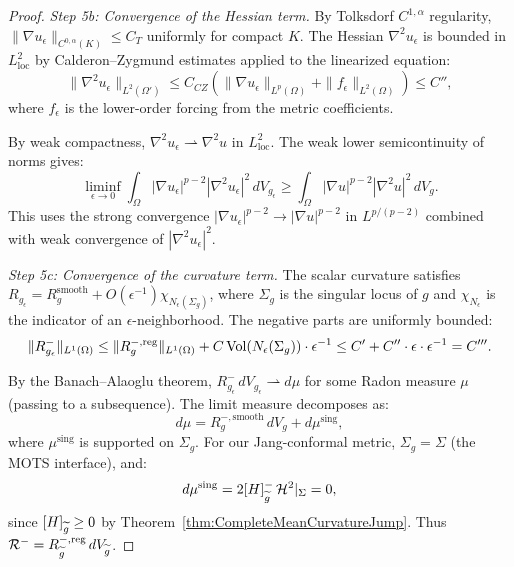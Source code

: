 \begin{proof}
\textit{Step 5b: Convergence of the Hessian term.} 
By Tolksdorf $C^{1,\alpha}$ regularity, $\|\nabla u_\epsilon\|_{C^{0,\alpha}(K)} \le C_T$ uniformly for compact $K$. The Hessian $\nabla^2 u_\epsilon$ is bounded in $L^2_{\mathrm{loc}}$ by Calderon--Zygmund estimates applied to the linearized equation:
\begin{equation}\label{eq:HessianL2Bound}
    \|\nabla^2 u_\epsilon\|_{L^2(\Omega')} \le C_{CZ} \left( \|\nabla u_\epsilon\|_{L^p(\Omega)} + \|f_\epsilon\|_{L^2(\Omega)} \right) \le C'',
\end{equation}
where $f_\epsilon$ is the lower-order forcing from the metric coefficients.

By weak compactness, $\nabla^2 u_\epsilon \rightharpoonup \nabla^2 u$ in $L^2_{\mathrm{loc}}$. The weak lower semicontinuity of norms gives:
\begin{equation}\label{eq:HessianLSC}
    \liminf_{\epsilon \to 0} \int_\Omega |\nabla u_\epsilon|^{p-2} |\nabla^2 u_\epsilon|^2 \, dV_{g_\epsilon} \ge \int_\Omega |\nabla u|^{p-2} |\nabla^2 u|^2 \, dV_g.
\end{equation}
This uses the strong convergence $|\nabla u_\epsilon|^{p-2} \to |\nabla u|^{p-2}$ in $L^{p/(p-2)}$ combined with weak convergence of $|\nabla^2 u_\epsilon|^2$.

\textit{Step 5c: Convergence of the curvature term.} 
The scalar curvature satisfies $R_{g_\epsilon} = R_g^{\text{smooth}} + O(\epsilon^{-1}) \chi_{N_\epsilon(\Sigma_g)}$, where $\Sigma_g$ is the singular locus of $g$ and $\chi_{N_\epsilon}$ is the indicator of an $\epsilon$-neighborhood. The negative parts are uniformly bounded:
\begin{equation}\label{eq:NegCurvatureBound}
    \|R_{g_\epsilon}^-\|_{L^1(\Omega)} \le \|R_g^{-,\text{reg}}\|_{L^1(\Omega)} + C \operatorname{Vol}(N_\epsilon(\Sigma_g)) \cdot \epsilon^{-1} \le C' + C'' \cdot \epsilon \cdot \epsilon^{-1} = C'''.
\end{equation}

By the Banach--Alaoglu theorem, $R_{g_\epsilon}^- \, dV_{g_\epsilon} \rightharpoonup d\mu$ for some Radon measure $\mu$ (passing to a subsequence). The limit measure decomposes as:
\begin{equation}\label{eq:MeasureDecomposition}
    d\mu = R_g^{-,\text{smooth}} \, dV_g + d\mu^{\text{sing}},
\end{equation}
where $\mu^{\text{sing}}$ is supported on $\Sigma_g$. For our Jang-conformal metric, $\Sigma_g = \Sigma$ (the MOTS interface), and:
\begin{equation}\label{eq:SingularMeasure}
    d\mu^{\text{sing}} = 2[H]_{\widetilde{g}}^- \, \mathcal{H}^2|_\Sigma = 0,
\end{equation}
since $[H]_{\widetilde{g}} \ge 0$ by Theorem~\ref{thm:CompleteMeanCurvatureJump}. Thus $\mathcal{R}^- = R_{\widetilde{g}}^{-,\text{reg}} \, dV_{\widetilde{g}}$.


\end{proof}
